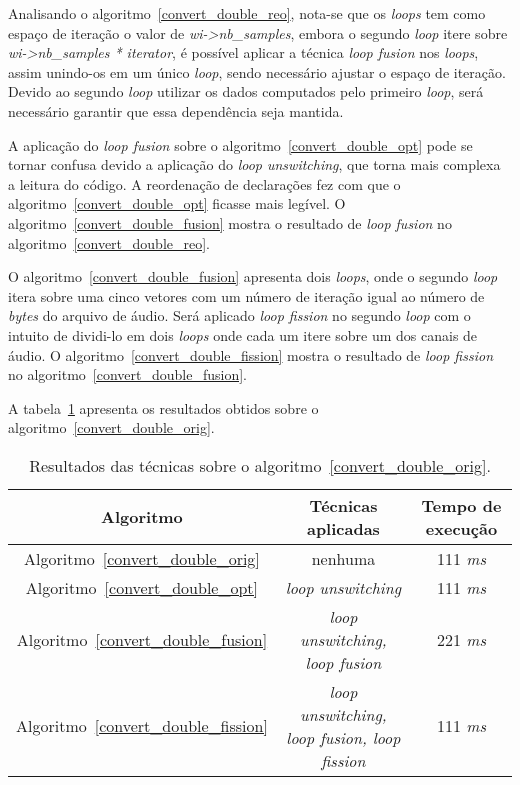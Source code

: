 Analisando o algoritmo~\ref{convert_double_reo}, nota-se que os 
\textit{loops} tem como
espaço de iteração o valor de \textit{wi->nb\_samples}, embora o segundo
\textit{loop} itere sobre \textit{wi->nb\_samples * iterator},  é possível aplicar
a técnica \textit{loop fusion} nos \textit{loops}, assim unindo-os em um
único \textit{loop}, sendo necessário ajustar o espaço de iteração. 
Devido ao
segundo \textit{loop} utilizar os dados computados pelo primeiro \textit{loop},
será necessário garantir que essa dependência seja mantida.

A aplicação do \textit{loop fusion} sobre o
algoritmo~\ref{convert_double_opt} pode se tornar confusa devido a aplicação do
\textit{loop unswitching}, que torna mais complexa a leitura do código. 
A reordenação de declarações fez com que o algoritmo~\ref{convert_double_opt}
ficasse mais legível.
O algoritmo~\ref{convert_double_fusion} mostra o 
resultado de \textit{loop fusion} no algoritmo~\ref{convert_double_reo}. 

O algoritmo~\ref{convert_double_fusion} apresenta dois \textit{loops}, onde o
segundo \textit{loop} itera sobre uma cinco vetores com um número de iteração
igual ao número de \textit{bytes} do arquivo de áudio. 
Será aplicado \textit{loop fission} no segundo \textit{loop} com o intuito de
dividi-lo em dois \textit{loops} onde cada um itere sobre um dos canais de
áudio.
O algoritmo~\ref{convert_double_fission} mostra o resultado de \textit{loop
fission} no algoritmo~\ref{convert_double_fusion}.


A tabela~\ref{tabela_convert_double} apresenta os resultados obtidos sobre o
algoritmo~\ref{convert_double_orig}.


\begin{table}[H]
  \caption{Resultados das técnicas sobre o algoritmo~\ref{convert_double_orig}.}
  \label{tabela_convert_double}
\begin{center}
  \begin{tabular}{c|c|c}
    Algoritmo & Técnicas aplicadas & Tempo de execução\\
    \hline
    Algoritmo~\ref{convert_double_orig} & nenhuma & 111 \textit{ms} \\
    \hline
    Algoritmo~\ref{convert_double_opt} & \textit{loop unswitching} & 111 \textit{ms} \\
    \hline
    Algoritmo~\ref{convert_double_fusion} & \textit{loop unswitching, loop fusion} & 221 \textit{ms} \\
    \hline
    Algoritmo~\ref{convert_double_fission} & \textit{loop unswitching, loop fusion, loop fission} & 111 \textit{ms} \\
    \hline
  \end{tabular}
\end{center}
\end{table}



